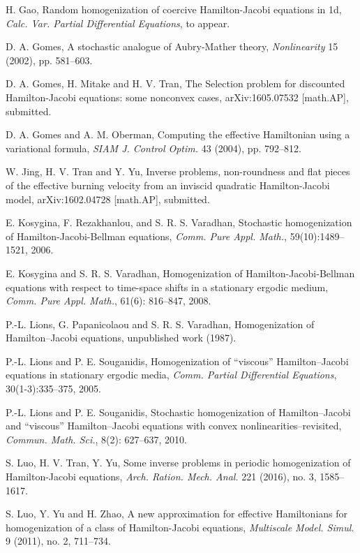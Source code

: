 \documentclass[12pt,reqno]{amsart}
\theoremstyle{plain}
\theoremstyle{remark}
\numberwithin{equation}{section}
\begin{document}
\begin{thebibliography}{99}
 H. Gao, 
 Random homogenization of coercive Hamilton-Jacobi equations in 1d,
\emph{Calc. Var. Partial Differential Equations}, to appear.


 D. A. Gomes,
A stochastic analogue of Aubry-Mather theory, 
\emph{Nonlinearity} 15 (2002), pp. 581--603.

D. A. Gomes, H. Mitake and H. V. Tran,
The Selection problem for discounted Hamilton-Jacobi equations: some nonconvex cases,
arXiv:1605.07532 [math.AP],
submitted.

D. A. Gomes and A. M. Oberman, 
Computing the effective Hamiltonian using a variational formula, 
\emph{SIAM J. Control Optim.} 43 (2004), pp. 792--812.


W. Jing, H. V. Tran and Y. Yu, Inverse problems, non-roundness and flat pieces of the effective burning velocity from an inviscid quadratic Hamilton-Jacobi model,
arXiv:1602.04728 [math.AP], submitted.


 E. Kosygina, F. Rezakhanlou, and S. R. S. Varadhan,
 Stochastic homogenization of Hamilton-Jacobi-Bellman equations,
 \emph{Comm. Pure  Appl. Math.}, 59(10):1489--1521, 2006.

E. Kosygina and S. R. S. Varadhan,
Homogenization of Hamilton-Jacobi-Bellman equations with respect to time-space shifts in a stationary ergodic medium,
\emph{Comm. Pure Appl. Math.},
61(6): 816--847, 2008.

P.-L. Lions, G. Papanicolaou and S. R. S. Varadhan,  
Homogenization of Hamilton--Jacobi equations, unpublished work (1987). 


P.-L. Lions and P. E. Souganidis,
 Homogenization of  ``viscous''  Hamilton--Jacobi equations in
stationary ergodic media,
\emph{Comm. Partial Differential Equations}, 30(1-3):335--375, 2005.



P.-L. Lions and P. E. Souganidis,
 Stochastic homogenization of Hamilton--Jacobi and ``viscous''
Hamilton--Jacobi equations with convex nonlinearities--revisited,
\emph{Commun. Math. Sci.}, 8(2): 627--637, 2010.


S. Luo, H. V. Tran, Y. Yu, 
Some inverse problems in periodic homogenization of Hamilton-Jacobi equations, 
\emph{Arch. Ration. Mech. Anal.} 221 (2016), no. 3, 1585--1617.


S. Luo, Y. Yu and H. Zhao,
A new approximation for effective Hamiltonians for homogenization of a class of Hamilton-Jacobi equations,
\emph{Multiscale Model. Simul.} 9 (2011), no. 2, 711--734. 


\end{thebibliography}
\end{document}
